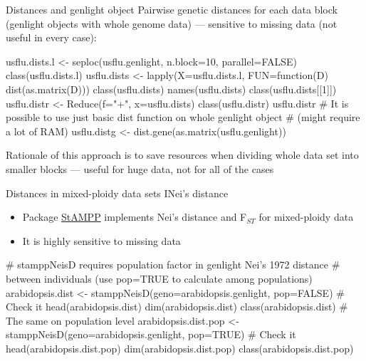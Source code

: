 \documentclass[compress, xelatex, 11pt, xcolor=svgnames, aspectratio=169, url={hyphens, lowtilde}]{beamer}
\begin{document}
\begin{frame}[fragile]{Distances and genlight object}
	\vfill
	Pairwise genetic distances for each data block (genlight objects with whole genome data) --- sensitive to missing data (not useful in every case):
	\vfill
	\begin{spluscode}
    usflu.dists.l <- seploc(usflu.genlight, n.block=10, parallel=FALSE)
    class(usflu.dists.l)
    usflu.dists <- lapply(X=usflu.dists.l, FUN=function(D) dist(as.matrix(D)))
    class(usflu.dists)
    names(usflu.dists)
    class(usflu.dists[[1]])
    usflu.distr <- Reduce(f="+", x=usflu.dists)
    class(usflu.distr)
    usflu.distr
    # It is possible to use just basic dist function on whole genlight object
    # (might require a lot of RAM)
    usflu.distg <- dist.gene(as.matrix(usflu.genlight))
	\end{spluscode}
	\vfil
	Rationale of this approach is to save resources when dividing whole data set into smaller blocks --- useful for huge data, not for all of the cases
	\vfill
\end{frame}

\begin{frame}[fragile]{Distances in mixed-ploidy data sets I}{Nei's distance}
	\begin{itemize}
		\item Package \href{https://CRAN.R-project.org/package=StAMPP}{StAMPP} implements Nei's distance and F$_{ST}$ for mixed-ploidy data
		\item It is highly sensitive to missing data
	\end{itemize}
	\begin{spluscode}
    # stamppNeisD requires population factor in genlight Nei's 1972 distance
    # between individuals (use pop=TRUE to calculate among populations)
    arabidopsis.dist <- stamppNeisD(geno=arabidopsis.genlight, pop=FALSE)
    # Check it
    head(arabidopsis.dist)
    dim(arabidopsis.dist)
    class(arabidopsis.dist)
    # The same on population level
    arabidopsis.dist.pop <- stamppNeisD(geno=arabidopsis.genlight, pop=TRUE)
    # Check it
    head(arabidopsis.dist.pop)
    dim(arabidopsis.dist.pop)
    class(arabidopsis.dist.pop)
	\end{spluscode}
\end{frame}
\end{document}
